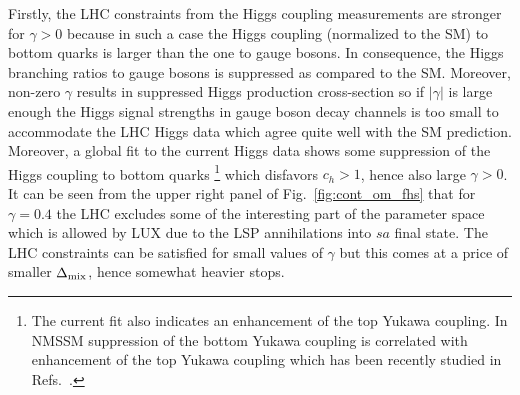 \documentclass[12pt,twoside]{article}
\begin{document}
Firstly, the LHC constraints from the Higgs coupling
measurements are stronger for $\gamma>0$ because in such a case the Higgs coupling (normalized to the SM) to bottom quarks
is larger than the one to gauge
bosons. In consequence, the Higgs branching ratios to gauge bosons is suppressed as compared to the SM. Moreover, non-zero $\gamma$ results in
suppressed Higgs production cross-section so if $|\gamma|$ is large enough the Higgs signal strengths in gauge boson decay channels is too small to
accommodate the LHC Higgs data  which agree quite well with the SM prediction. Moreover, a global fit to the current Higgs data shows some
suppression of the Higgs coupling to bottom quarks \cite{Higgscomb}
\footnote{The current fit also indicates an enhancement of the top Yukawa coupling. In NMSSM suppression  of
the bottom Yukawa coupling is correlated with enhancement of the top Yukawa coupling which has been recently studied in Refs.~\cite{tth1,tth2}.}
which disfavors $c_h>1$, hence also large $\gamma>0$. It can be seen from the upper right panel of Fig.~\ref{fig:cont_om_fhs} that for $\gamma=0.4$
the LHC excludes some of the interesting part of the parameter space which is allowed by LUX due to the LSP annihilations into $sa$ final state. The
LHC constraints can be satisfied for small values of $\gamma$ but this comes at a price of smaller $\Delta_{\rm mix}$, hence somewhat heavier stops. 
\end{document}
